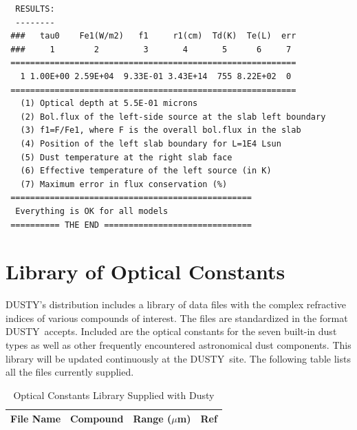 \documentclass[11pt]{article}
\def\D  {{\sf DUSTY}}
\def\mic    {\hbox{$\mu$m}}
\begin{document}
\begin{appendix}
\begin{verbatim}
  RESULTS:
  --------
 ###   tau0    Fe1(W/m2)   f1     r1(cm)  Td(K)  Te(L)  err
 ###     1        2         3       4       5      6     7
 ==========================================================
   1 1.00E+00 2.59E+04  9.33E-01 3.43E+14  755 8.22E+02  0
 ==========================================================
   (1) Optical depth at 5.5E-01 microns
   (2) Bol.flux of the left-side source at the slab left boundary
   (3) f1=F/Fe1, where F is the overall bol.flux in the slab
   (4) Position of the left slab boundary for L=1E4 Lsun
   (5) Dust temperature at the right slab face
   (6) Effective temperature of the left source (in K)
   (7) Maximum error in flux conservation (%)
 =================================================
  Everything is OK for all models
 ========== THE END ==============================
\end{verbatim}

\newpage

\section{Library of Optical Constants}
\label{nklib}

\D's distribution includes a library of data files with the complex refractive
indices of various compounds of interest.  The files are standardized in the
format \D\ accepts. Included are the optical constants for the seven built-in
dust types as well as other frequently encountered astronomical dust
components.  This library will be updated continuously at the \D\ site. The
following table lists all the files currently supplied.

\begin{table}[h]
\begin{center}

\caption{\hfil Optical Constants Library Supplied with Dusty} \centerline{}

\begin{tabular}{llrr}
\hline \hline
 \multicolumn{1}{c}{File Name}    &
 \multicolumn{1}{c}{Compound}     &
 \multicolumn{1}{c}{Range (\mic)} &
 \multicolumn{1}{c}{Ref}
 \\
    \hline


\end{tabular}
\end{center}
\end{table}
\end{appendix}
\end{document}
